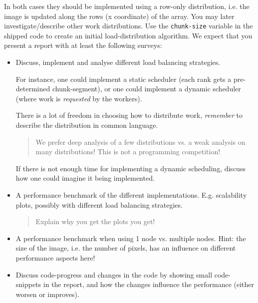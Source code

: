 \documentclass{article}
\begin{document}
In both cases they should be implemented using a row-only
distribution, i.e. the image is updated along the rows (x coordinate) of the array.
You may later investigate/describe other work distributions.
Use the \texttt{chunk-size} variable in the shipped code to
create an initial load-distribution algorithm.
We expect that you present a report with at least the following
surveys:

\begin{itemize}
  \item Discuss, implement and analyse different load balancing strategies.

    For instance, one could implement a static scheduler (each rank gets
    a pre-determined chunk-segment), or one could implement a dynamic
    scheduler (where work is \emph{requested} by the workers).

    There is a lot of freedom in choosing
    how to distribute work, \emph{remember} to describe
    the distribution in common language.

    \begin{quote}
      We prefer deep analysis of a few distributions vs.
      a weak analysis on many distributions!
      This is not a programming competition!
    \end{quote}

    If there is not enough time for implementing a dynamic scheduling,
    discuss how one could imagine it being implemented.


  \item A performance benchmark of the different implementations.
    E.g. scalability plots, possibly with different load balancing
    strategies.

    \begin{quote}
      Explain why you get the plots you get!
    \end{quote}

  \item A performance benchmark when using 1 node vs. multiple nodes. Hint:
    the size of the image, i.e. the number of pixels, has an influence on
    different performance aspects here!

  \item Discuss code-progress and changes in the code by showing small code-snippets
    in the report, and how the changes influence the performance (either worsen or
    improves).

\end{itemize}
\end{document}
